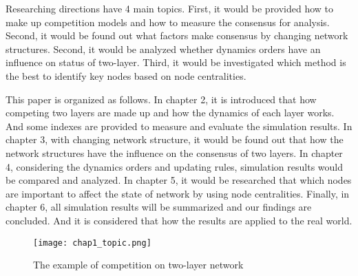 Researching directions have 4 main topics. First, it would be provided how to make up competition models and how to measure the consensus for analysis. Second, it would be found out what factors make consensus by changing network structures. Second, it would be analyzed whether dynamics orders have an influence on status of two-layer. Third, it would be investigated which method is the best to identify key nodes based on node centralities.

This paper is organized as follows. In chapter 2, it is introduced that how competing two layers are made up and how the dynamics of each layer works. And some indexes are provided to measure and evaluate the simulation results. In chapter 3, with changing network structure, it would be found out that how the network structures have the influence on the consensus of two layers. In chapter 4, considering the dynamics orders and updating rules, simulation results would be compared and analyzed. In chapter 5, it would be researched that which nodes are important to affect the state of network by using node centralities. Finally, in chapter 6, all simulation results will be summarized and our findings are concluded. And it is considered that how the results are applied to the real world. 

\begin{figure}[!htb]
	\centering
	\texttt{[image: chap1\_topic.png]}
	\caption{The example of competition on two-layer network}
	\label{chap1_topic}
\end{figure}
